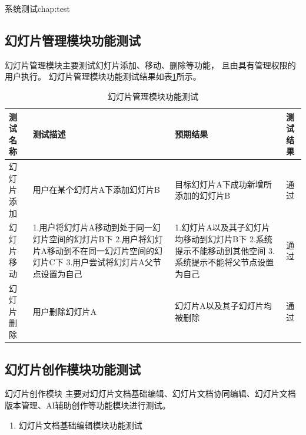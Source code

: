 \begin{cuzchapter}{系统测试}{chap:test}
\subsection{幻灯片管理模块功能测试}
幻灯片管理模块主要测试幻灯片添加、移动、删除等功能，
且由具有管理权限的用户执行。
幻灯片管理模块功能测试结果如表\ref{tab:test-slide-management}所示。
    \begin{table}[htbp]
        \caption{幻灯片管理模块功能测试}
        \label{tab:test-slide-management}
        \centering
        \begin{tabular}{>{\raggedright\arraybackslash}p{2.5cm} >{\raggedright\arraybackslash}p{5.5cm} >{\raggedright\arraybackslash}p{4cm} c}
            \toprule
            测试名称        & 测试描述                & 预期结果              & 测试结果 \\
            \midrule
            幻灯片添加     &    用户在某个幻灯片A下添加幻灯片B  & 目标幻灯片A下成功新增所添加的幻灯片B    & 通过 \\
            \addlinespace
            幻灯片移动    & 1.用户将幻灯片A移动到处于同一幻灯片空间的幻灯片B下 \newline 2.用户将幻灯片A移动到不在同一幻灯片空间的幻灯片C下 \newline 3.用户尝试将幻灯片A父节点设置为自己  & 1.幻灯片A以及其子幻灯片均移动到幻灯片B下 \newline 2.系统提示不能移动到其他空间 \newline 3.系统提示不能将父节点设置为自己  & 通过 \\
            \addlinespace
            幻灯片删除 & 用户删除幻灯片A & 幻灯片A以及其子幻灯片均被删除        & 通过 \\
        
            \bottomrule
        \end{tabular}
    \end{table}
    \subsection{幻灯片创作模块功能测试}
    
    幻灯片创作模块
    主要对幻灯片文档基础编辑、幻灯片文档协同编辑、幻灯片文档版本管理、AI辅助创作等功能模块进行测试。
    
    \begin{enumerate}
        \item 幻灯片文档基础编辑模块功能测试
        

\end{enumerate}
\end{cuzchapter}
